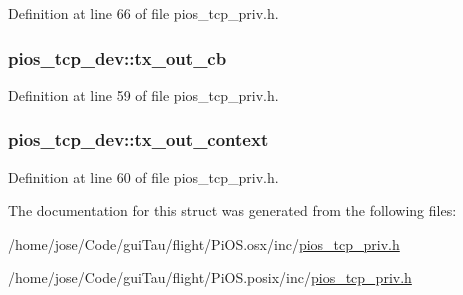 Definition at line 66 of file pios\-\_\-tcp\-\_\-priv.\-h.

\hypertarget{structpios__tcp__dev_a10013d710f6d487f7051ae7f65a5a860}{
\subsubsection[{tx\-\_\-out\-\_\-cb}]{ pios\-\_\-tcp\-\_\-dev\-::tx\-\_\-out\-\_\-cb}}\label{structpios__tcp__dev_a10013d710f6d487f7051ae7f65a5a860}


Definition at line 59 of file pios\-\_\-tcp\-\_\-priv.\-h.

\hypertarget{structpios__tcp__dev_a044651f28c824dc2ab57223f1f5a0b35}{
\subsubsection[{tx\-\_\-out\-\_\-context}]{ pios\-\_\-tcp\-\_\-dev\-::tx\-\_\-out\-\_\-context}}\label{structpios__tcp__dev_a044651f28c824dc2ab57223f1f5a0b35}


Definition at line 60 of file pios\-\_\-tcp\-\_\-priv.\-h.



The documentation for this struct was generated from the following files\-:\begin{DoxyCompactItemize}
\item 
/home/jose/\-Code/gui\-Tau/flight/\-Pi\-O\-S.\-osx/inc/\hyperlink{_pi_o_s_8osx_2inc_2pios__tcp__priv_8h}{pios\-\_\-tcp\-\_\-priv.\-h}\item 
/home/jose/\-Code/gui\-Tau/flight/\-Pi\-O\-S.\-posix/inc/\hyperlink{_pi_o_s_8posix_2inc_2pios__tcp__priv_8h}{pios\-\_\-tcp\-\_\-priv.\-h}\end{DoxyCompactItemize}
